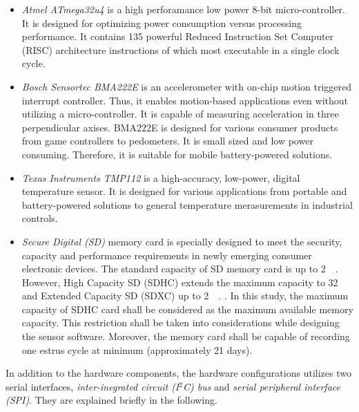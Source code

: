 \documentclass[english,12pt,a4paper,pdftex,elec,utf8]{aaltothesis}
\begin{document}
\begin{itemize}
\item \textit{Atmel ATmega32u4} is a high perforamance low power 8-bit micro-controller. It is designed for optimizing power consumption versus processing performance. It contains 135 powerful Reduced Instruction Set Computer (RISC) architecture instructions of which most executable in a single clock cycle.  \cite{atmega32u4datasheet} 

\item \textit{Bosch Sensortec BMA222E} is an accelerometer with on-chip motion triggered interrupt controller. Thus, it enables motion-based applications even without utilizing a micro-controller. It is capable of measuring acceleration in three perpendicular axises. BMA222E is designed for various consumer products from game controllers to pedometers. It is small sized and low power consuming. Therefore, it is suitable for mobile battery-powered solutions.  \cite{bma222datasheet} 

\item \textit{Texas Instruments TMP112} is a high-accuracy, low-power, digital temperature sensor. It is designed for various applications from portable and battery-powered solutions to general temperature merasurements in industrial controls. \cite{tmp112datasheet} 

\item \textit{Secure Digital (SD)} memory card is specially designed to meet the security, capacity and performance requirements in newly emerging consumer electronic devices. The standard capacity of SD memory card is up to \SI{2}{\giga\byte}. However, High Capacity SD (SDHC) extends the maximum capacity to \SI{32}{\giga\byte} and Extended Capacity SD (SDXC) up to \SI{2}{\tera\byte}. \cite{sdspecification}. In this study, the maximum capacity of SDHC card shall be considered as the maximum available memory capacity. This restriction shall be taken into considerations while designing the sensor software. Moreover, the memory card shall be capable of recording one estrus cycle at minimum (approximately 21 days).

\end{itemize} In addition to the hardware components, the hardware configurations utilizes two serial interfaces, \textit{inter-inegrated circuit (I$^2$C) bus} and \textit{serial peripheral interface (SPI)}. They are explained briefly in the following.
\end{document}
